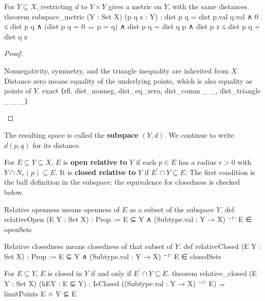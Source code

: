 \begin{proposition} \label{an1:lem:subspace-metric}
  \begin{lean}{For $Y\subseteq X$, restricting $d$ to $Y\times Y$ gives a metric on $Y$, with the same distances.}
    theorem subspace_metric (Y : Set X) (p q z : Y) :
        dist p q = dist p.val q.val ∧ 0 ≤ dist p q ∧
        (dist p q = 0 ↔ p = q) ∧ dist p q = dist q p ∧
        dist p z ≤ dist p q + dist q z
  \end{lean}
\end{proposition}

\begin{proof}
  \begin{lean}{Nonnegativity, symmetry, and the triangle inequality are inherited from $X$. Distance zero means equality of the underlying points, which is also equality as points of $Y$.}
    exact ⟨rfl, dist_nonneg, dist_eq_zero, dist_comm _ _, dist_triangle _ _ _⟩
  \end{lean}

\end{proof}

The resulting space is called the \textbf{subspace} $(Y,d)$. We continue to write $d(p,q)$ for its distance.

\begin{definition} \label{an1:def:relative-open-closed-sets}
  For $E\subseteq Y\subseteq X$, $E$ is \textbf{open relative to} $Y$ if each $p\in E$ has a radius $r>0$ with $Y\cap N_r(p)\subseteq E$.
  It is \textbf{closed relative to} $Y$ if $E^{\prime}\cap Y\subseteq E$.
  The first condition is the ball definition in the subspace; the equivalence for closedness is checked below.
  \begin{lean}{Relative openness means openness of $E$ as a subset of the subspace $Y$.}
    def relativeOpen (E Y : Set X) : Prop :=
      E ⊆ Y ∧ (Subtype.val : Y → X) ⁻¹' E ∈ openSets
  \end{lean}
  \begin{lean}{Relative closedness means closedness of that subset of $Y$.}
    def relativeClosed (E Y : Set X) : Prop :=
      E ⊆ Y ∧ (Subtype.val : Y → X) ⁻¹' E ∈ closedSets
  \end{lean}
\end{definition}

\begin{lemma} \label{an1:lem:relative-closed}
  \begin{lean}{For $E\subseteq Y$, $E$ is closed in $Y$ if and only if $E^{\prime}\cap Y\subseteq E$.}
    theorem relative_closed (E Y : Set X) (hEY : E ⊆ Y) :
        IsClosed ((Subtype.val : Y → X) ⁻¹' E) ↔ limitPoints E ∩ Y ⊆ E
  \end{lean}
\end{lemma}

